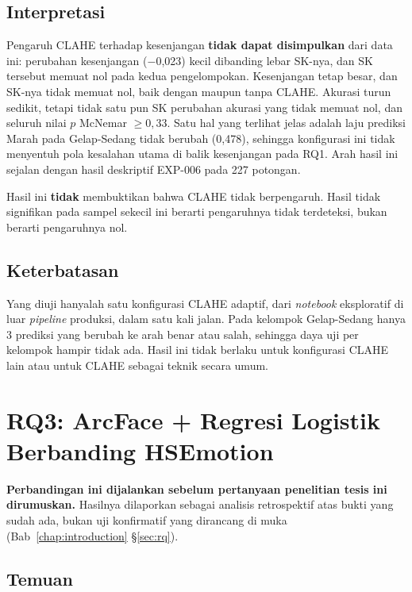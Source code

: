 \subsection*{Interpretasi}

Pengaruh CLAHE terhadap kesenjangan \textbf{tidak dapat disimpulkan} dari data ini: perubahan kesenjangan ($-$0,023) kecil dibanding lebar SK-nya, dan SK tersebut memuat nol pada kedua pengelompokan. Kesenjangan tetap besar, dan SK-nya tidak memuat nol, baik dengan maupun tanpa CLAHE. Akurasi turun sedikit, tetapi tidak satu pun SK perubahan akurasi yang tidak memuat nol, dan seluruh nilai $p$ McNemar $\geq 0,33$. Satu hal yang terlihat jelas adalah laju prediksi Marah pada Gelap-Sedang tidak berubah (0,478), sehingga konfigurasi ini tidak menyentuh pola kesalahan utama di balik kesenjangan pada RQ1. Arah hasil ini sejalan dengan hasil deskriptif EXP-006 pada 227 potongan.

Hasil ini \textbf{tidak} membuktikan bahwa CLAHE tidak berpengaruh. Hasil tidak signifikan pada sampel sekecil ini berarti pengaruhnya tidak terdeteksi, bukan berarti pengaruhnya nol.

\subsection*{Keterbatasan}

Yang diuji hanyalah satu konfigurasi CLAHE adaptif, dari \textit{notebook} eksploratif di luar \textit{pipeline} produksi, dalam satu kali jalan. Pada kelompok Gelap-Sedang hanya 3 prediksi yang berubah ke arah benar atau salah, sehingga daya uji per kelompok hampir tidak ada. Hasil ini tidak berlaku untuk konfigurasi CLAHE lain atau untuk CLAHE sebagai teknik secara umum.

\section{RQ3: ArcFace + Regresi Logistik Berbanding HSEmotion}
\label{sec:rq3-results}

\textbf{Perbandingan ini dijalankan sebelum pertanyaan penelitian tesis ini dirumuskan.} Hasilnya dilaporkan sebagai analisis retrospektif atas bukti yang sudah ada, bukan uji konfirmatif yang dirancang di muka (Bab~\ref{chap:introduction} \S\ref{sec:rq}).

\subsection*{Temuan}

